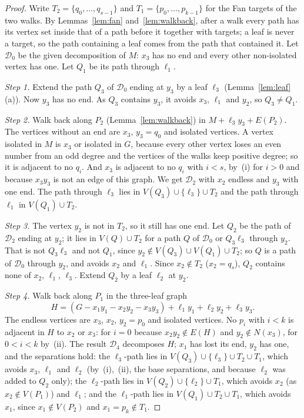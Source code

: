 \documentclass[11pt]{amsart}
\theoremstyle{definition}
\newcommand{\cD}{\mathcal D}
\begin{document}
\begin{proof}
Write $T_2=\{q_0,\dots,q_{s-1}\}$ and $T_1=\{p_0,\dots,p_{k-1}\}$ for the Fan targets of the two
walks. By Lemmas~\ref{lem:fan} and~\ref{lem:walkback}, after a walk every path has its vertex set
inside that of a path before it together with targets; a leaf is never a target, so the path
containing a leaf comes from the path that contained it. Let $\cD_0$ be the given decomposition
of $M$: $x_3$ has no end and every other non-isolated vertex has one. Let $Q_1$ be its path
through $\ell_1$.

\emph{Step 1.} Extend the path $Q_3$ of $\cD_0$ ending at $y_3$ by a leaf $\ell_3$
(Lemma~\ref{lem:leaf}(a)). Now $y_3$ has no end. As $Q_3$ contains $y_3$, it avoids $x_3$,
$\ell_1$ and $y_2$, so $Q_3\ne Q_1$.

\emph{Step 2.} Walk back along $P_2$ (Lemma~\ref{lem:walkback}) in $M+\ell_3y_3+E(P_2)$. The vertices
without an end are $x_3$, $y_3=q_0$ and isolated vertices. A vertex isolated in $M$ is $x_3$ or
isolated in $G$, because every other vertex loses an even number from an odd degree and the
vertices of the walks keep positive degree; so it is adjacent to no $q_i$. And $x_3$ is adjacent
to no $q_i$ with
$i<s$, by~(i) for $i>0$ and because $x_3y_3$ is not an edge of this graph. We get $\cD_2$ with
$x_2$ endless and $y_3$ with one end. The path through $\ell_3$ lies in
$V(Q_3)\cup\{\ell_3\}\cup T_2$ and the path through $\ell_1$ in $V(Q_1)\cup T_2$.

\emph{Step 3.} The vertex $y_2$ is not in $T_2$, so it still has one end. Let $Q_2$ be the path of
$\cD_2$ ending at $y_2$; it lies in $V(Q)\cup T_2$ for a path $Q$ of $\cD_0$ or $Q_3\ell_3$ through
$y_2$. That is not $Q_3\ell_3$ and not $Q_1$, since $y_2\notin V(Q_3)\cup V(Q_1)\cup T_2$; so $Q$ is a
path of $\cD_0$ through $y_2$, and avoids $x_2$ and $\ell_1$. Since $x_2\notin T_2$ ($x_2=q_s$),
$Q_2$ contains none of $x_2$, $\ell_1$, $\ell_3$. Extend $Q_2$ by a leaf $\ell_2$ at $y_2$.

\emph{Step 4.} Walk back along $P_1$ in the three-leaf graph
\[
H=(G-x_1y_1-x_2y_2-x_3y_3)+\ell_1y_1+\ell_2y_2+\ell_3y_3.
\]
The endless vertices are $x_3$, $x_2$, $y_2=p_0$ and isolated vertices. No $p_i$ with $i<k$ is
adjacent in $H$ to $x_2$ or $x_3$: for $i=0$ because $x_2y_2\notin E(H)$ and $y_2\notin N(x_3)$,
for $0<i<k$ by~(ii). The result $\cD_4$ decomposes $H$; $x_1$ has lost its end, $y_2$ has one, and
the separations hold: the $\ell_3$-path lies in $V(Q_3)\cup\{\ell_3\}\cup T_2\cup T_1$, which avoids
$x_3$, $\ell_1$ and $\ell_2$ (by~(i),~(ii), the base separations, and because $\ell_2$ was added
to $Q_2$ only); the $\ell_2$-path lies in $V(Q_2)\cup\{\ell_2\}\cup T_1$, which avoids $x_2$ (as
$x_2\notin V(P_1)$) and $\ell_1$; and the $\ell_1$-path lies in $V(Q_1)\cup T_2\cup T_1$, which
avoids $x_1$, since $x_1\notin V(P_2)$ and $x_1=p_k\notin T_1$.


\end{proof}
\end{document}
